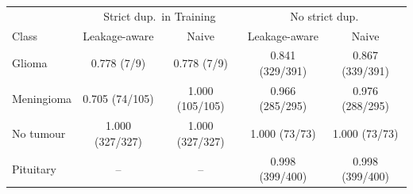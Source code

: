 \begin{tabular}{lcccc}
\toprule
 & \multicolumn{2}{c}{Strict dup.\ in Training} & \multicolumn{2}{c}{No strict dup.} \\
Class & Leakage-aware & Naive & Leakage-aware & Naive \\
\midrule
Glioma & 0.778 (7/9) & 0.778 (7/9) & 0.841 (329/391) & 0.867 (339/391) \\
Meningioma & 0.705 (74/105) & 1.000 (105/105) & 0.966 (285/295) & 0.976 (288/295) \\
No tumour & 1.000 (327/327) & 1.000 (327/327) & 1.000 (73/73) & 1.000 (73/73) \\
Pituitary & -- & -- & 0.998 (399/400) & 0.998 (399/400) \\
\bottomrule
\end{tabular}